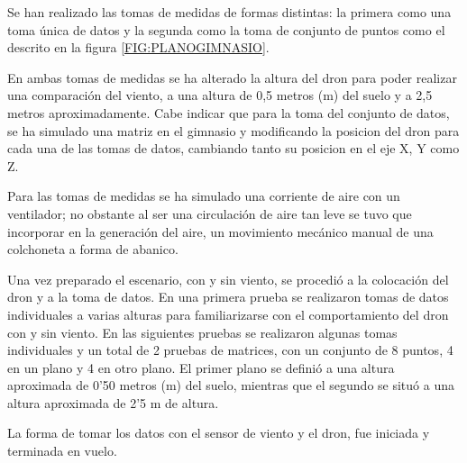 
Se han realizado las tomas de medidas de formas distintas: la primera como una toma única de datos y la segunda como la toma de conjunto de puntos como el descrito en la figura \ref{FIG:PLANOGIMNASIO}.

En ambas tomas de medidas se ha alterado la altura del dron para poder realizar una comparación del viento, a una altura de 0,5 metros (m) del suelo y a 2,5 metros aproximadamente. Cabe indicar que para la toma del conjunto de datos, se ha simulado una matriz en el gimnasio y modificando la posicion del dron para cada una de las tomas de datos, cambiando tanto su posicion en el eje X, Y como Z.

Para las tomas de medidas se ha simulado una corriente de aire con un ventilador; no obstante al ser una circulación de aire tan leve se tuvo que incorporar en la generación del aire, un movimiento mecánico manual de una colchoneta a forma de abanico.

Una vez preparado el escenario, con y sin viento, se procedió a la colocación del dron y a la toma de datos. En una primera prueba se realizaron tomas de datos individuales a varias alturas para familiarizarse con el comportamiento del dron con y sin viento. En las siguientes pruebas se realizaron algunas tomas individuales y un total de 2 pruebas de matrices, con un conjunto de 8 puntos, 4 en un plano y 4 en otro plano. El primer plano se definió a una altura aproximada de 0'50 metros (m) del suelo, mientras que el segundo se situó a una altura aproximada de 2'5 m de altura. 

La forma de tomar los datos con el sensor de viento y el dron, fue iniciada y terminada en vuelo.